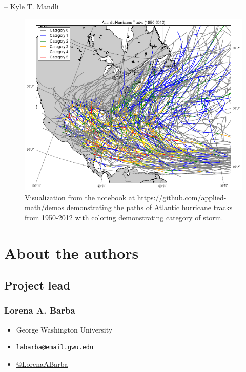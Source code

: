 \documentclass[]{book}
\providecommand{\tightlist}{%
  \setlength{\itemsep}{0pt}\setlength{\parskip}{0pt}}
\begin{document}
-- Kyle T. Mandli

\begin{figure}
\centering
\includegraphics{images/hurricanes.png}
\caption{Visualization from the notebook at
\url{https://github.com/applied-math/demos} demonstrating the paths of
Atlantic hurricane tracks from 1950-2012 with coloring demonstrating
category of storm.}
\end{figure}

\hypertarget{authors}{\chapter{About the authors}\label{authors}}

\section{Project lead}\label{project-lead}

\subsection*{Lorena A. Barba}\label{lorena-a.-barba}

\begin{itemize}
\tightlist
\item
  George Washington University
\item
  \href{mailto:labarba@email.gwu.edu}{\nolinkurl{labarba@email.gwu.edu}}
\item
  \href{https://twitter.com/LorenaABarba}{@LorenaABarba}
\end{itemize}
\end{document}
